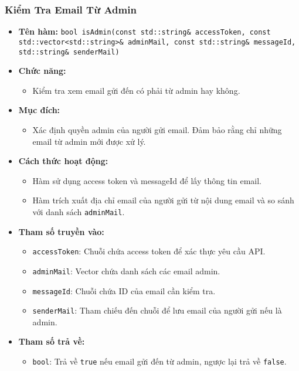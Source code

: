 \subsubsection{Kiểm Tra Email Từ Admin}
\begin{itemize}
    \item \textbf{Tên hàm:} \texttt{bool isAdmin(const std::string\& accessToken, const \\std::vector<std::string>\& adminMail, const std::string\& messageId, \\std::string\& senderMail)}
    \item \textbf{Chức năng:} 
    \begin{itemize}
        \item Kiểm tra xem email gửi đến có phải từ admin hay không.
    \end{itemize}
    \item \textbf{Mục đích:} 
    \begin{itemize}
        \item Xác định quyền admin của người gửi email. Đảm bảo rằng chỉ những email từ admin mới được xử lý.
    \end{itemize}
    \item \textbf{Cách thức hoạt động:} 
    \begin{itemize}
        \item Hàm sử dụng access token và messageId để lấy thông tin email.
        \item Hàm trích xuất địa chỉ email của người gửi từ nội dung email và so sánh với danh sách \texttt{adminMail}.
    \end{itemize}
    \item \textbf{Tham số truyền vào:} 
    \begin{itemize}
        \item \texttt{accessToken}: Chuỗi chứa access token để xác thực yêu cầu API.
        \item \texttt{adminMail}: Vector chứa danh sách các email admin.
        \item \texttt{messageId}: Chuỗi chứa ID của email cần kiểm tra.
        \item \texttt{senderMail}: Tham chiếu đến chuỗi để lưu email của người gửi nếu là admin.
    \end{itemize}
    \item \textbf{Tham số trả về:} 
    \begin{itemize}
        \item \texttt{bool}: Trả về \texttt{true} nếu email gửi đến từ admin, ngược lại trả về \texttt{false}.
    \end{itemize}
\end{itemize}

